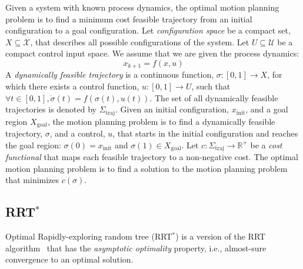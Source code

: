 \documentclass[letterpaper, 10pt, english, conference]{IEEEtran}
\begin{document}
Given a system with known process dynamics, the
optimal motion planning problem is to find a minimum cost feasible
trajectory from an initial configuration to a goal configuration. Let
{\em configuration space} be a compact set, $X \subseteq \mathcal{X}$,
that describes all possible configurations of the system. Let $U
\subseteq \mathcal{U}$ be a compact control input space. We assume that we
are given the process dynamics:
\[
x_{k+1} = f(x,u)
\]
A {\em dynamically feasible trajectory} is a continuous function,
$\sigma: [0,1] \to X$, for which there exists a control function,
$u:[0,1] \to U$, such that $\forall t \in [0,1], \dot{\sigma}(t) =
f(\sigma(t),u(t))$. The set of all dynamically feasible trajectories
is denoted by $\Sigma_\mathrm{traj}$. Given an initial configuration,
$x_\mathrm{init}$, and a goal region $X_\mathrm{goal}$, the motion
planning problem is to find a dynamically feasible trajectory,
$\sigma$, and a control, $u$, that starts in the initial configuration
and reaches the goal region: $\sigma(0) = x_\mathrm{init}$ and
$\sigma(1) \in X_\mathrm{goal}$. Let $c : \Sigma_\mathrm{traj} \to
\mathbb{R}^+$ be a {\em cost functional} that maps each feasible
trajectory to a non-negative cost. The optimal motion planning problem
is to find a solution to the motion planning problem that minimizes
$c(\sigma)$.

\subsection{RRT$^*$}

Optimal Rapidly-exploring random tree (RRT$^*$) \cite{karaman.frazzoli.ijrr11} is a version of the RRT algorithm~\cite{lavalle.kuffner.ijrr01} that has the \emph{asymptotic optimality} property, i.e., almost-sure convergence to an optimal solution.
\end{document}
